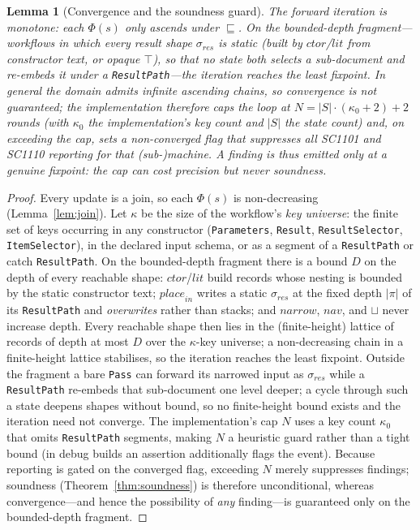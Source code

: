 \documentclass[11pt]{article}
\newcommand{\code}[1]{\textsf{\small #1}}
\newcommand{\narrow}{\mathit{narrow}}
\newcommand{\place}{\mathit{place}}
\theoremstyle{plain}
\newtheorem{lemma}{Lemma}
\theoremstyle{definition}
\theoremstyle{remark}
\begin{document}
\begin{lemma}[Convergence and the soundness guard]\label{lem:term}
The forward iteration is monotone: each $\Phi(s)$ only ascends under $\sqsubseteq$. On the
\emph{bounded-depth fragment}---workflows in which every result shape $\sigma_{\mathit{res}}$ is
\emph{static} (built by $\mathit{ctor}$/$\mathit{lit}$ from constructor text, or opaque
$\top$), so that no state both selects a sub-document and re-embeds it under a
\texttt{ResultPath}---the iteration reaches the least fixpoint. In general the domain admits
infinite ascending chains, so convergence is not guaranteed; the implementation therefore caps
the loop at $N=|S|\cdot(\kappa_0+2)+2$ rounds (with $\kappa_0$ the implementation's key count
and $|S|$ the state count) and, on exceeding the cap, sets a \emph{non-converged} flag that
suppresses \emph{all} \code{SC1101} and \code{SC1110} reporting for that (sub-)machine. A
finding is thus emitted only at a genuine fixpoint: the cap can cost precision but never
soundness.
\end{lemma}
\begin{proof}
Every update is a join, so each $\Phi(s)$ is non-decreasing (Lemma~\ref{lem:join}). Let $\kappa$
be the size of the workflow's \emph{key universe}: the finite set of keys occurring in any
constructor (\texttt{Parameters}, \texttt{Result}, \texttt{ResultSelector},
\texttt{ItemSelector}), in the declared input schema, or as a segment of a \texttt{ResultPath}
or catch \texttt{ResultPath}. On the bounded-depth fragment there is a bound $D$ on the depth of
every reachable shape: $\mathit{ctor}$/$\mathit{lit}$ build records whose nesting is bounded by
the static constructor text; $\place_{\mathit{in}}$ writes a static $\sigma_{\mathit{res}}$ at
the fixed depth $|\pi|$ of its \texttt{ResultPath} and \emph{overwrites} rather than stacks; and
$\narrow$, $\mathit{nav}$, and $\sqcup$ never increase depth. Every reachable shape then lies in
the (finite-height) lattice of records of depth at most $D$ over the $\kappa$-key universe; a
non-decreasing chain in a finite-height lattice stabilises, so the iteration reaches the least
fixpoint. Outside the fragment a bare \texttt{Pass} can forward its narrowed input as
$\sigma_{\mathit{res}}$ while a \texttt{ResultPath} re-embeds that sub-document one level deeper;
a cycle through such a state deepens shapes without bound, so no finite-height bound exists and
the iteration need not converge. The implementation's cap $N$ uses a key count $\kappa_0$ that
omits \texttt{ResultPath} segments, making $N$ a heuristic guard rather than a tight bound (in
debug builds an assertion additionally flags the event). Because reporting is gated on the
converged flag, exceeding $N$ merely suppresses findings; soundness
(Theorem~\ref{thm:soundness}) is therefore unconditional, whereas convergence---and hence the
possibility of \emph{any} finding---is guaranteed only on the bounded-depth fragment.
\end{proof}
\end{document}
